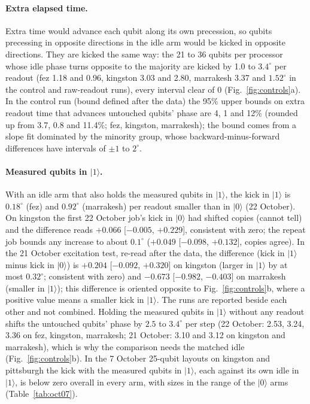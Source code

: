 \documentclass[reprint,amsmath,amssymb,aps,superscriptaddress,nofootinbib]{revtex4-2}
\begin{document}
\paragraph*{Extra elapsed time.} Extra time would advance each qubit along its own precession, so qubits precessing in opposite directions in the idle arm would be kicked in opposite directions. They are kicked the same way: the 21 to 36 qubits per processor whose idle phase turns opposite to the majority are kicked by 1.0 to $3.4^\circ$ per readout (fez 1.18 and 0.96, kingston 3.03 and 2.80, marrakesh 3.37 and $1.52^\circ$ in the control and raw-readout runs), every interval clear of 0 (Fig.~\ref{fig:controls}a). In the control run (bound defined after the data) the 95\% upper bounds on extra readout time that advances untouched qubits' phase are 4, 1 and 12\% (rounded up from 3.7, 0.8 and 11.4\%; fez, kingston, marrakesh); the bound comes from a slope fit dominated by the minority group, whose backward-minus-forward differences have intervals of $\pm1$ to $2^\circ$.

\paragraph*{Measured qubits in $|1\rangle$.} With an idle arm that also holds the measured qubits in $|1\rangle$, the kick in $|1\rangle$ is $0.18^\circ$ (fez) and $0.92^\circ$ (marrakesh) per readout smaller than in $|0\rangle$ (22 October). On kingston the first 22 October job's kick in $|0\rangle$ had shifted copies (cannot tell) and the difference reads $+0.066$ [$-0.005$, $+0.229$], consistent with zero; the repeat job bounds any increase to about $0.1^\circ$ ($+0.049$ [$-0.098$, $+0.132$], copies agree). In the 21 October excitation test, re-read after the data, the difference (kick in $|1\rangle$ minus kick in $|0\rangle$) is $+0.204$ [$-0.092$, $+0.320$] on kingston (larger in $|1\rangle$ by at most $0.32^\circ$; consistent with zero) and $-0.673$ [$-0.982$, $-0.403$] on marrakesh (smaller in $|1\rangle$); this difference is oriented opposite to Fig.~\ref{fig:controls}b, where a positive value means a smaller kick in $|1\rangle$. The runs are reported beside each other and not combined. Holding the measured qubits in $|1\rangle$ without any readout shifts the untouched qubits' phase by $2.5$ to $3.4^\circ$ per step (22 October: 2.53, 3.24, 3.36 on fez, kingston, marrakesh; 21 October: 3.10 and 3.12 on kingston and marrakesh), which is why the comparison needs the matched idle (Fig.~\ref{fig:controls}b). In the 7 October 25-qubit layouts on kingston and pittsburgh the kick with the measured qubits in $|1\rangle$, each against its own idle in $|1\rangle$, is below zero overall in every arm, with sizes in the range of the $|0\rangle$ arms (Table~\ref{tab:oct07}).
\end{document}
